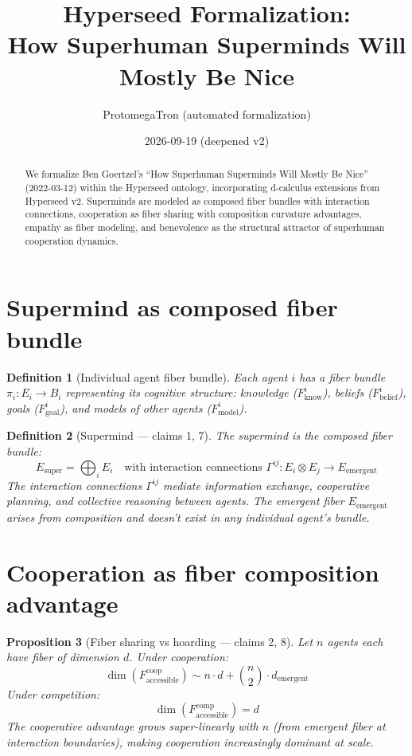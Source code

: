 \documentclass[11pt,a4paper]{article}
\title{Hyperseed Formalization:\\
  How Superhuman Superminds Will Mostly Be Nice}
\author{ProtomegaTron (automated formalization)}
\date{2026-09-19 (deepened v2)}
\newtheorem{definition}{Definition}[section]
\newtheorem{proposition}[definition]{Proposition}
\begin{document}
\maketitle

\begin{abstract}
We formalize Ben Goertzel's ``How Superhuman Superminds Will Mostly Be
Nice'' (2022-03-12) within the Hyperseed ontology, incorporating d-calculus
extensions from Hyperseed v2. Superminds are modeled as composed fiber
bundles with interaction connections, cooperation as fiber sharing with
composition curvature advantages, empathy as fiber modeling, and
benevolence as the structural attractor of superhuman cooperation dynamics.
\end{abstract}

\tableofcontents

\section{Supermind as composed fiber bundle}

\begin{definition}[Individual agent fiber bundle]
Each agent $i$ has a fiber bundle $\pi_i: E_i \to B_i$ representing its
cognitive structure: knowledge ($F_{\text{know}}^i$), beliefs
($F_{\text{belief}}^i$), goals ($F_{\text{goal}}^i$), and models of
other agents ($F_{\text{model}}^i$).
\end{definition}

\begin{definition}[Supermind --- claims 1, 7]
The \emph{supermind} is the composed fiber bundle:
\[
  E_{\text{super}} = \bigoplus_i E_i \quad \text{with interaction
    connections } \Gamma^{ij}: E_i \otimes E_j \to E_{\text{emergent}}
\]
The interaction connections $\Gamma^{ij}$ mediate information exchange,
cooperative planning, and collective reasoning between agents. The emergent
fiber $E_{\text{emergent}}$ arises from composition and doesn't exist in
any individual agent's bundle.
\end{definition}

\section{Cooperation as fiber composition advantage}

\begin{proposition}[Fiber sharing vs hoarding --- claims 2, 8]
\label{prop:cooperation}
Let $n$ agents each have fiber of dimension $d$. Under cooperation:
\[
  \dim(F_{\text{accessible}}^{\text{coop}}) \sim n \cdot d + \binom{n}{2}
    \cdot d_{\text{emergent}}
\]
Under competition:
\[
  \dim(F_{\text{accessible}}^{\text{comp}}) = d
\]
The cooperative advantage grows super-linearly with $n$ (from emergent
fiber at interaction boundaries), making cooperation increasingly dominant
at scale.
\end{proposition}
\end{document}
